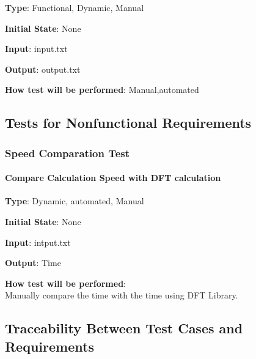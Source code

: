 \documentclass[12pt, titlepage]{article}
\begin{document}
\textbf {Type}: Functional, Dynamic, Manual
					
\textbf {Initial State}: None
					
\textbf {Input}: input.txt
					
\textbf {Output}: output.txt
					
\textbf {How test will be performed}: Manual,automated



\subsection{Tests for Nonfunctional Requirements}

\subsubsection{Speed Comparation Test}
		
\paragraph{Compare Calculation Speed with DFT calculation\\}

\textbf {Type}: Dynamic, automated, Manual
					
\textbf {Initial State}: None
					
\textbf {Input}: intput.txt
					
\textbf {Output}: Time
					
\textbf {How test will be performed}: \\
Manually compare the time with the time using DFT Library.


\subsection{Traceability Between Test Cases and Requirements}


		
\end{document}
